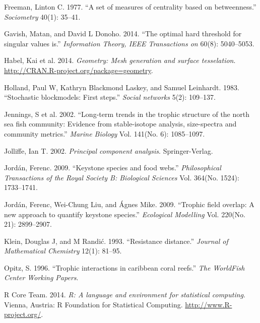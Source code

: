 \documentclass[11pt,article,oneside]{memoir}
\begin{document}
Freeman, Linton C. 1977. ``A set of measures of centrality based on
betweenness.'' \emph{Sociometry} 40(1): 35--41.

Gavish, Matan, and David L Donoho. 2014. ``The optimal hard threshold
for singular values is.'' \emph{Information Theory, IEEE Transactions
on} 60(8): 5040--5053.

Habel, Kai et al. 2014. \emph{Geometry: Mesh generation and surface
tesselation}. \url{http://CRAN.R-project.org/package=geometry}.

Holland, Paul W, Kathryn Blackmond Laskey, and Samuel Leinhardt. 1983.
``Stochastic blockmodels: First steps.'' \emph{Social networks} 5(2):
109--137.

Jennings, S et al. 2002. ``Long-term trends in the trophic structure of
the north sea fish community: Evidence from stable-isotope analysis,
size-spectra and community metrics.'' \emph{Marine Biology} Vol. 141(No.
6): 1085--1097.

Jolliffe, Ian T. 2002. \emph{Principal component analysis}.
Springer-Verlag.

Jordán, Ferenc. 2009. ``Keystone species and food webs.''
\emph{Philosophical Transactions of the Royal Society B: Biological
Sciences} Vol. 364(No. 1524): 1733--1741.

Jordán, Ferenc, Wei-Chung Liu, and Ágnes Mike. 2009. ``Trophic field
overlap: A new approach to quantify keystone species.'' \emph{Ecological
Modelling} Vol. 220(No. 21): 2899--2907.

Klein, Douglas J, and M Randić. 1993. ``Resistance distance.''
\emph{Journal of Mathematical Chemistry} 12(1): 81--95.

Opitz, S. 1996. ``Trophic interactions in caribbean coral reefs.''
\emph{The WorldFish Center Working Papers}.

R Core Team. 2014. \emph{R: A language and environment for statistical
computing}. Vienna, Austria: R Foundation for Statistical Computing.
\url{http://www.R-project.org/}.
\end{document}
